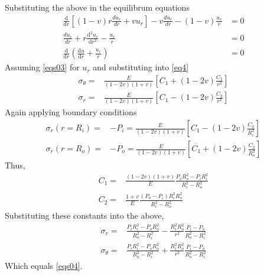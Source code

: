 \documentclass[11pt]{article} %
\begin{document}
Substituting the above in the equilibrum equations
\begin{equation}\nonumber\begin{aligned}
\frac{\mathrm{d}}{\mathrm{d} r}\left[(1-v) r \frac{d u_{r}}{d r}+v u_{r}\right]-v \frac{d u_{r}}{d r}-(1-v) \frac{u_{r}}{r}&=0\\
\frac{d u_{r}}{d r}+r \frac{\mathrm{d}^{2} u_{r}}{\mathrm{d} r^{2}}-\frac{u_{r}}{r}&=0\\
\frac{\mathrm{d}}{\mathrm{d} r}\left(\frac{\mathrm{d} u}{\mathrm{d} r}+\frac{u_{r}}{r}\right)&=0
\end{aligned}
\end{equation}
Assuming \cref{eqs03} for $u_r$ and substituting into \cref{eq4}
\begin{equation}\nonumber\begin{aligned}
\sigma_{\theta}=&\frac{E}{(1-2 v)(1+v)}\left[C_{1}+(1-2 v) \frac{C_{2}}{r^{2}}\right]\\
\sigma_{r}=&\frac{E}{(1-2 v)(1+v)}\left[C_{1}-(1-2 v) \frac{C_{2}}{r^{2}}\right]
\end{aligned}
\end{equation}
Again applying boundary conditions
\begin{equation}\nonumber
\begin{aligned}
\sigma_r(r=R_i)=&-P_i=\frac{E}{(1-2 v)(1+v)}\left[C_{1}-(1-2 v) \frac{C_{2}}{R_i^{2}}\right]\\
\sigma_r(r=R_o)=&-P_{o}=\frac{E}{(1-2 v)(1+v)}\left[C_{1}+(1-2 v) \frac{C_{2}}{R_o^{2}}\right]
\end{aligned}
\end{equation}
Thus,
\begin{equation}\nonumber\begin{aligned}
C_{1}=&\frac{(1-2 v)(1+v)}{E} \frac{P_{o} R_o^{2}-P_{i} R_i^{2}}{R_i^{2}-R_o^{2}}\\
C_{2}=&\frac{1+v}{E} \frac{\left(P_{o}-P_{i}\right) R_i^{2} R_o^{2}}{R_i^{2}-R_o^{2}}
\end{aligned}
\end{equation}
Substituting these constants into the above,
\begin{equation}\nonumber\begin{aligned}
\sigma_{r}=&\frac{P_{i} R_i^{2}-P_{o} R_o^{2}}{R_o^{2}-R_i^{2}}-\frac{R_i^{2} R_o^{2}}{r^{2}} \frac{P_{i}-P_{o}}{R_o^{2}-R_i^{2}} \\
\sigma_{\theta}=&\frac{P_{i} R_i^{2}-P_{o} R_o^{2}}{R_o^{2}-R_i^{2}}+\frac{R_i^{2} R_o^{2}}{r^{2}} \frac{P_{i}-P_{o}}{R_o^{2}-R_i^{2}}
\end{aligned}
\end{equation}
Which equals \cref{eqs04}.
\end{document}
